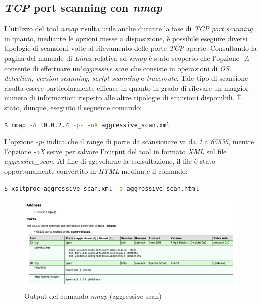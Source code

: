 \subsection{\emph{TCP} port scanning con \emph{nmap}}
L'utilizzo del tool \emph{nmap} risulta utile anche durante la fase di \emph{TCP port scanning} in quanto, mediante le opzioni messe a disposizione, è possibile eseguire diversi tipologie di scansioni volte al rilevamento delle porte \emph{TCP} aperte. Consultando la pagina del manuale di \emph{Linux} relativa ad \emph{nmap} \cite{nmap} è stato scoperto che l'opzione \emph{-A} consente di effettuare un'\emph{aggressive scan} che consiste in operazioni di \emph{OS detection, version scanning, script scanning} e \emph{traceroute}. Tale tipo di scansione risulta essere particolarmente efficace in quanto in grado di rilevare un maggior numero di informazioni rispetto alle altre tipologie di scansioni disponibili. È stato, dunque, eseguito il seguente comando: 
\begin{lstlisting}[language=bash] 
    $ nmap -A 10.0.2.4 -p- -oX aggressive_scan.xml
\end{lstlisting}
L'opzione \emph{-p-} indica che il range di porte da scansionare va da \emph{1} a \emph{65535}, mentre l'opzione \emph{-oX} serve per salvare l'output del tool in formato \emph{XML} sul file \emph{aggressive\_scan}. Al fine di agevolarne la consultazione, il file è stato opportunamente convertito in \emph{HTML} mediante il comando:
\begin{lstlisting}[language=bash]
    $ xsltproc aggressive_scan.xml -o aggressive_scan.html
\end{lstlisting}
\begin{figure}[h]
    \centering
    \includegraphics[scale=0.45]{capitoli/images/aggressive_scan.png}
    \caption{Output del comando \emph{nmap} (aggressive scan)}
    \label{fig:aggressive_scan}
\end{figure}
